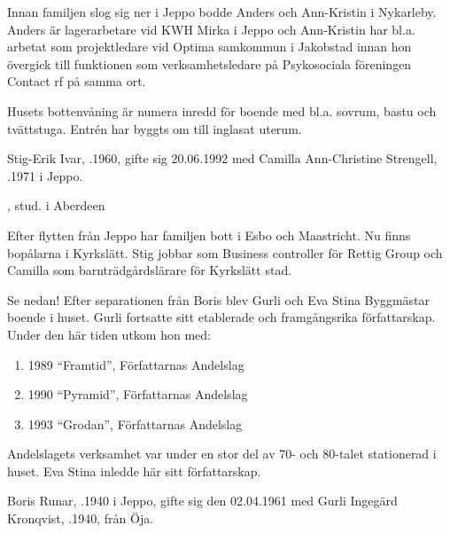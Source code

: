 Innan familjen slog sig ner i Jeppo bodde Anders och Ann-Kristin i Nykarleby. Anders är lagerarbetare vid KWH Mirka i Jeppo och Ann-Kristin har bl.a. arbetat som projektledare vid Optima samkommun i Jakobstad innan hon övergick till funktionen som verksamhetsledare på Psykosociala föreningen Contact rf på samma ort.

Husets bottenvåning är numera inredd för boende med bl.a. sovrum, bastu och tvättstuga. Entrén har byggts om till inglasat uterum.


Stig-Erik Ivar, .1960, gifte sig 20.06.1992 med Camilla Ann-Christine Strengell, .1971 i Jeppo.
\begin{jhchildren}
  \item {}, stud. i Aberdeen
  \item {}
  \item {}
  \item {}
\end{jhchildren}

Efter flytten från Jeppo har familjen bott i Esbo och Maastricht. Nu finns bopålarna i Kyrkslätt. Stig jobbar som Business controller för Rettig Group och Camilla som barnträdgårdslärare för Kyrkslätt stad.


Se nedan! Efter separationen från Boris blev Gurli och Eva Stina Byggmästar	boende i huset. Gurli fortsatte sitt etablerade och framgångsrika författarskap. Under den här tiden utkom hon med:
\begin{enumerate}
  \item 1989	``Framtid'', Författarnas Andelslag
  \item 1990	``Pyramid'', Författarnas Andelslag
  \item 1993	``Grodan'', Författarnas Andelslag
\end{enumerate}


Andelslagets verksamhet var under en stor del av 70- och 80-talet stationerad i huset. Eva Stina inledde här sitt författarskap.


Boris Runar, .1940 i Jeppo, gifte sig den 02.04.1961 med Gurli Ingegärd Kronqvist, .1940, från Öja.
\begin{jhchildren}
  \item {}
  \item {}
  \item {}
\end{jhchildren}

